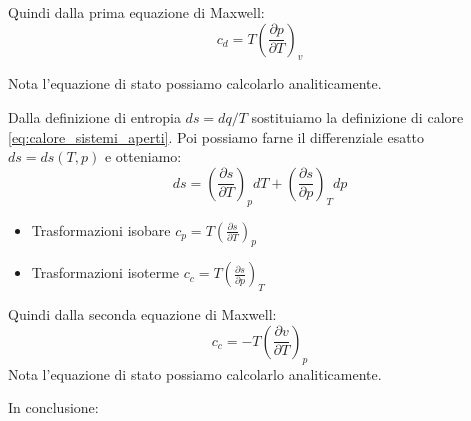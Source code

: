 \documentclass[a4paper]{article}
\numberwithin{equation}{section}%
\begin{document}
Quindi dalla prima equazione di Maxwell: 
\begin{equation}
c_{d}=T\left(\frac{\partial p}{\partial T}\right)_{v}
\end{equation}

Nota l'equazione di stato possiamo calcolarlo analiticamente. 
\newline


Dalla definizione di entropia $ds=dq/T$ sostituiamo la definizione di calore \eqref{eq:calore_sistemi_aperti}. Poi possiamo farne il differenziale esatto $ds=ds(T,p)$ e otteniamo:
\begin{equation}
d s=\left(\frac{\partial s}{\partial T}\right)_{p} d T+\left(\frac{\partial s}{\partial p}\right)_{T} d p
\end{equation}

\begin{itemize}
	\item Trasformazioni isobare $c_{p}=T\left(\frac{\partial s}{\partial T}\right)_{p}$
	\item Trasformazioni isoterme $c_{c}=T\left(\frac{\partial s}{\partial p}\right)_{T}$
\end{itemize}

Quindi dalla seconda equazione di Maxwell: 
\begin{equation}
c_{c}=-T\left(\frac{\partial v}{\partial T}\right)_{p}
\end{equation}
Nota l'equazione di stato possiamo calcolarlo analiticamente. 
\newline

In conclusione: 
\end{document}
